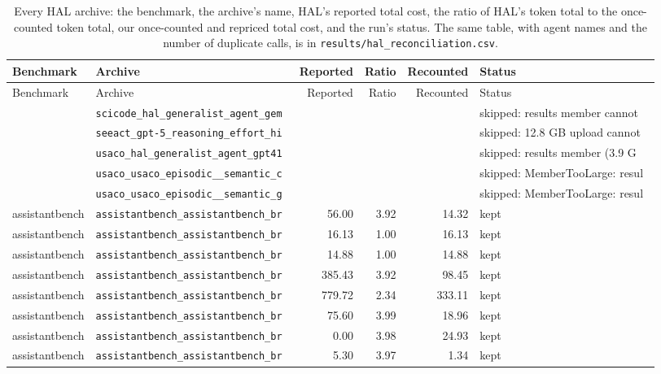 {\scriptsize\setlength{\tabcolsep}{3pt}
\begin{longtable}{llrrrl}
\caption{Every HAL archive: the benchmark, the archive's name, HAL's reported total cost, the ratio of HAL's token total to the once-counted token total, our once-counted and repriced total cost, and the run's status. The same table, with agent names and the number of duplicate calls, is in \texttt{results/hal\_reconciliation.csv}.}\label{tab:supp-reconciliation}\\
\toprule
Benchmark & Archive & Reported & Ratio & Recounted & Status \\
\midrule
\endfirsthead
\toprule
Benchmark & Archive & Reported & Ratio & Recounted & Status \\
\midrule
\endhead
\bottomrule
\endfoot
 & \texttt{\scriptsize scicode\_hal\_generalist\_agent\_gem~} &  &  &  & skipped: results member cannot~ \\
 & \texttt{\scriptsize seeact\_gpt-5\_reasoning\_effort\_hi~} &  &  &  & skipped: 12.8 GB upload cannot~ \\
 & \texttt{\scriptsize usaco\_hal\_generalist\_agent\_gpt41~} &  &  &  & skipped: results member (3.9 G~ \\
 & \texttt{\scriptsize usaco\_usaco\_episodic\_\_semantic\_c~} &  &  &  & skipped: MemberTooLarge: resul~ \\
 & \texttt{\scriptsize usaco\_usaco\_episodic\_\_semantic\_g~} &  &  &  & skipped: MemberTooLarge: resul~ \\
assistantbench & \texttt{\scriptsize assistantbench\_assistantbench\_br~} & 56.00 & 3.92 & 14.32 & kept \\
assistantbench & \texttt{\scriptsize assistantbench\_assistantbench\_br~} & 16.13 & 1.00 & 16.13 & kept \\
assistantbench & \texttt{\scriptsize assistantbench\_assistantbench\_br~} & 14.88 & 1.00 & 14.88 & kept \\
assistantbench & \texttt{\scriptsize assistantbench\_assistantbench\_br~} & 385.43 & 3.92 & 98.45 & kept \\
assistantbench & \texttt{\scriptsize assistantbench\_assistantbench\_br~} & 779.72 & 2.34 & 333.11 & kept \\
assistantbench & \texttt{\scriptsize assistantbench\_assistantbench\_br~} & 75.60 & 3.99 & 18.96 & kept \\
assistantbench & \texttt{\scriptsize assistantbench\_assistantbench\_br~} & 0.00 & 3.98 & 24.93 & kept \\
assistantbench & \texttt{\scriptsize assistantbench\_assistantbench\_br~} & 5.30 & 3.97 & 1.34 & kept \\

\end{longtable}}

